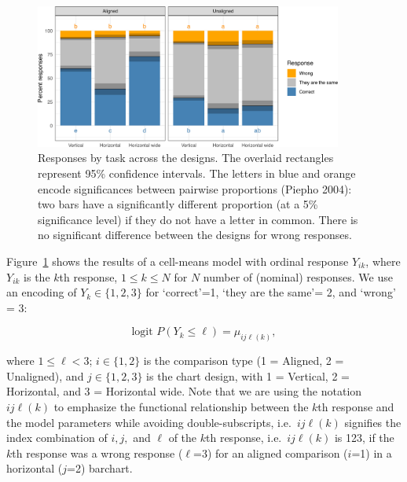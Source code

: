 \documentclass[
]{jds}
\begin{document}
\begin{figure}[hbt]

{\centering \includegraphics[width=0.9\textwidth,height=\textheight]{./figures/fig-response-123-1.png}

}

\caption{\label{fig-response-123}Responses by task across the designs.
The overlaid rectangles represent 95\% confidence intervals. The letters
in blue and orange encode significances between pairwise proportions
(Piepho 2004): two bars have a significantly different proportion (at a
5\% significance level) if they do not have a letter in common. There is
no significant difference between the designs for wrong responses.}

\end{figure}

Figure~\ref{fig-response-123} shows the results of a cell-means model
with ordinal response \(Y_{ik}\), where \(Y_{ik}\) is the \(k\)th
response, \(1 \le k \le N\) for \(N\) number of (nominal) responses. We
use an encoding of \(Y_k \in \{1, 2, 3\}\) for `correct'=1, `they are
the same'= 2, and `wrong' = 3:

\begin{equation}
\text{logit }P(Y_k \le \ell) = \mu_{ij\ell(k)},
\end{equation}

where \(1 \le \ell < 3\); \(i \in \{1, 2\}\) is the comparison type (1 =
Aligned, 2 = Unaligned), and \(j \in \{1, 2, 3\}\) is the chart design,
with 1 = Vertical, 2 = Horizontal, and 3 = Horizontal wide. Note that we
are using the notation \(ij\ell(k)\) to emphasize the functional
relationship between the \(k\)th response and the model parameters while
avoiding double-subscripts, i.e.~\(ij\ell(k)\) signifies the index
combination of \(i, j,\) and \(\ell\) of the \(k\)th response,
i.e.~\(ij\ell(k)\) is 123, if the \(k\)th response was a wrong response
(\(\ell\)=3) for an aligned comparison (\(i\)=1) in a horizontal
(\(j\)=2) barchart.
\end{document}

